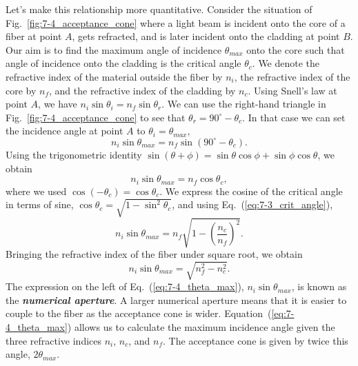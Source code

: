 Let's make this relationship more quantitative.
Consider the situation of Fig.~\ref{fig:7-4_acceptance_cone} where a light beam is incident onto the core of a fiber at point $A$, gets refracted, and is later incident onto the cladding at point $B$.
Our aim is to find the maximum angle of incidence $\theta_{max}$ onto the core such that angle of incidence onto the cladding is the critical angle $\theta_c$.
We denote the refractive index of the material outside the fiber by $n_i$, the refractive index of the core by $n_f$, and the refractive index of the cladding by $n_c$.
Using Snell's law at point $A$, we have $n_i \sin \theta_i = n_f \sin \theta_r$.
We can use the right-hand triangle in Fig.~\ref{fig:7-4_acceptance_cone} to see that $\theta_r = 90^{\circ} - \theta_c$.
In that case we can set the incidence angle at point $A$ to $\theta_i = \theta_{max}$,
\begin{equation}
    n_i \sin \theta_{max} = n_f \sin (90^{\circ} - \theta_c).
\end{equation}
Using the trigonometric identity $\sin(\theta + \phi) = \sin\theta\cos\phi + \sin\phi\cos\theta$, we obtain
\begin{equation}
    n_i \sin \theta_{max} = n_f \cos\theta_c,
\end{equation}
where we used $\cos(-\theta_c) = \cos\theta_c$.
We express the cosine of the critical angle in terms of sine, $\cos\theta_c = \sqrt{1 - \sin^2\theta_c}$, and using Eq.~(\ref{eq:7-3_crit_angle}),
\begin{equation}
    n_i \sin \theta_{max} = n_f \sqrt{1 - \left( \frac{n_c}{n_f} \right)^2}.
\end{equation}
Bringing the refractive index of the fiber under square root, we obtain
\begin{equation}
    n_i \sin \theta_{max} = \sqrt{n_f^2 -  n_c^2}.
    \label{eq:7-4_theta_max}
\end{equation}
The expression on the left of Eq.~(\ref{eq:7-4_theta_max}), $n_i \sin \theta_{max}$, is known as the \textit{\textbf{numerical aperture}}.
A larger numerical aperture means that it is easier to couple to the fiber as the acceptance cone is wider.
Equation~(\ref{eq:7-4_theta_max}) allows us to calculate the maximum incidence angle given the three refractive indices $n_i$, $n_c$, and $n_f$.
The acceptance cone is given by twice this angle, $2 \theta_{max}$.

